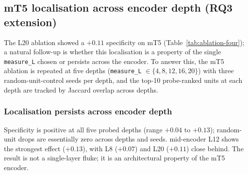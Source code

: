 \subsection{mT5 localisation across encoder depth (RQ3 extension)}
\label{sec:mt5-localisation}

The L20 ablation showed a $+0.11$ specificity on mT5 (Table~\ref{tab:ablation-four}); a natural follow-up is whether this localisation is a property of the single \texttt{measure\_L} chosen or persists across the encoder. To answer this, the mT5 ablation is repeated at five depths (\texttt{measure\_L} $\in \{4, 8, 12, 16, 20\}$) with three random-unit-control seeds per depth, and the top-10 probe-ranked units at each depth are tracked by Jaccard overlap across depths.

\subsubsection{Localisation persists across encoder depth}

\begin{table}[H]
\centering
\caption{mT5 encoder ablation across depth. Top-10 versus random-mean specificity per measure\_L. Localisation persists across encoder depth; mid-encoder (L12) is strongest.}
\label{tab:mt5-depth}
\small
{}
\end{table}

Specificity is positive at all five probed depths (range $+0.04$ to $+0.13$); random-unit drops are essentially zero across depths and seeds. mid-encoder L12 shows the strongest effect ($+0.13$), with L8 ($+0.07$) and L20 ($+0.11$) close behind. The result is not a single-layer fluke; it is an architectural property of the mT5 encoder.


